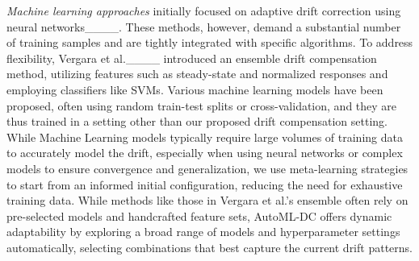 \emph{Machine learning approaches} initially focused on adaptive drift correction using neural networks____. These methods, however, demand a substantial number of training samples and are tightly integrated with specific algorithms. To address flexibility, Vergara et al.____ introduced an ensemble drift compensation method, utilizing features such as steady-state and normalized responses and employing classifiers like SVMs. 
Various machine learning models have been proposed, often using random train-test splits or cross-validation, and they are thus trained in a setting other than our proposed drift compensation setting. While Machine Learning models typically require large volumes of training data to accurately model the drift, especially when using neural networks or complex models to ensure convergence and generalization, we use meta-learning strategies to start from an informed initial configuration, reducing the need for exhaustive training data. While methods like those in Vergara et al.'s ensemble often rely on pre-selected models and handcrafted feature sets, AutoML-DC offers dynamic adaptability by exploring a broad range of models and hyperparameter settings automatically, selecting combinations that best capture the current drift patterns.